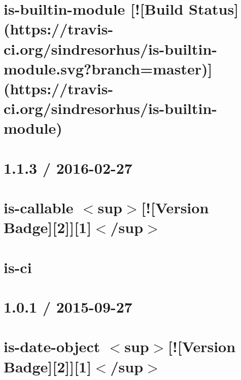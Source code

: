 \documentclass[twoside]{book}
\newcommand{\+}{\discretionary{\mbox{\scriptsize$\hookleftarrow$}}{}{}}
\begin{document}
\chapter{is-\/builtin-\/module \mbox{[}!\mbox{[}Build Status\mbox{]}(https\+://travis-\/ci.org/sindresorhus/is-\/builtin-\/module.svg?branch=master)\mbox{]}(https\+://travis-\/ci.org/sindresorhus/is-\/builtin-\/module)}
\label{md__c_1_workspace_demo_src_main_script_node_modules_is-builtin-module_readme}

\chapter{1.1.3 / 2016-\/02-\/27}
\label{md__c_1_workspace_demo_src_main_script_node_modules_is-callable__c_h_a_n_g_e_l_o_g}

\chapter{is-\/callable $<$sup$>$\mbox{[}!\mbox{[}Version Badge\mbox{]}\mbox{[}2\mbox{]}\mbox{]}\mbox{[}1\mbox{]}$<$/sup$>$}
\label{md__c_1_workspace_demo_src_main_script_node_modules_is-callable__r_e_a_d_m_e}

\chapter{is-\/ci}
\label{md__c_1_workspace_demo_src_main_script_node_modules_is-ci__r_e_a_d_m_e}

\chapter{1.0.1 / 2015-\/09-\/27}
\label{md__c_1_workspace_demo_src_main_script_node_modules_is-date-object__c_h_a_n_g_e_l_o_g}

\chapter{is-\/date-\/object $<$sup$>$\mbox{[}!\mbox{[}Version Badge\mbox{]}\mbox{[}2\mbox{]}\mbox{]}\mbox{[}1\mbox{]}$<$/sup$>$}
\label{md__c_1_workspace_demo_src_main_script_node_modules_is-date-object__r_e_a_d_m_e}

\end{document}
